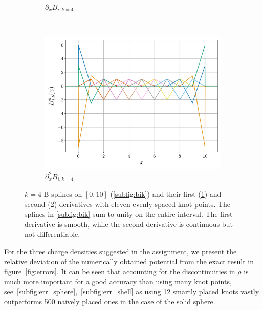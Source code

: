 \documentclass[a4paper,DIV=12,english]{scrartcl}
\begin{document}
\begin{figure}
\begin{subfigure}{0.49\textwidth}
        \caption{$\partial_x B_{i, k=4}$}
        \label{subfig:bik_x}
    \end{subfigure}\\
    \begin{subfigure}{0.49\textwidth}
        \centering
        \includegraphics[width=\textwidth]{../plots/B_i_k_xx/B_i_xx.pdf}
        \caption{$\partial_x^2 B_{i, k=4}$}
        \label{subfig:bik_xx}
    \end{subfigure}
    \caption{$k=4$ B-splines on $[0, 10]$ (\ref{subfig:bik}) and their first (\ref{subfig:bik_x}) and second (\ref{subfig:bik_xx}) derivatives with eleven evenly spaced knot points. The splines in \ref{subfig:bik} sum to unity on the entire interval. The first derivative is smooth, while the second derivative is continuous but not differentiable.}
    \label{fig:splines}
\end{figure}

For the three charge densities suggested in the assignment, we present the relative deviation of the numerically obtained potential from the exact result in figure~\ref{fig:errors}. It can be seen that accounting for the discontinuities in $\rho$ is much more important for a good accuracy than using many knot points, see~\ref{subfig:err_sphere},~\ref{subfig:err_shell} as using 12 smartly placed knots vastly outperforms 500 naively placed ones in the case of the solid sphere. 
\end{document}
